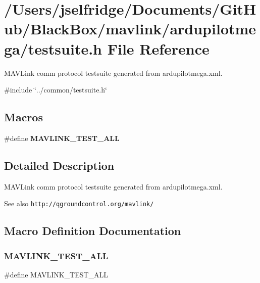 \section{/\+Users/jselfridge/\+Documents/\+Git\+Hub/\+Black\+Box/mavlink/ardupilotmega/testsuite.h File Reference}
\label{ardupilotmega_2testsuite_8h}


M\+A\+V\+Link comm protocol testsuite generated from ardupilotmega.\+xml.  


{\ttfamily \#include \char`\"{}../common/testsuite.\+h\char`\"{}}\newline
\subsection*{Macros}
\begin{DoxyCompactItemize}
\item 
\#define \textbf{ M\+A\+V\+L\+I\+N\+K\+\_\+\+T\+E\+S\+T\+\_\+\+A\+LL}
\end{DoxyCompactItemize}


\subsection{Detailed Description}
M\+A\+V\+Link comm protocol testsuite generated from ardupilotmega.\+xml. 

\begin{DoxySeeAlso}{See also}
{\tt http\+://qgroundcontrol.\+org/mavlink/} 
\end{DoxySeeAlso}


\subsection{Macro Definition Documentation}
\mbox{\label{ardupilotmega_2testsuite_8h_ae706a993ca59ccc1a8a7c330f0b1ceec}} 
\subsubsection{M\+A\+V\+L\+I\+N\+K\+\_\+\+T\+E\+S\+T\+\_\+\+A\+LL}
{\footnotesize\ttfamily \#define M\+A\+V\+L\+I\+N\+K\+\_\+\+T\+E\+S\+T\+\_\+\+A\+LL}

